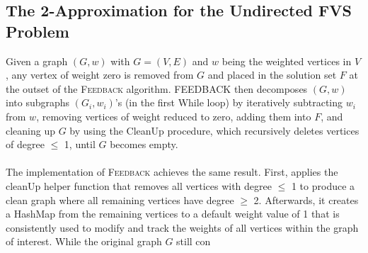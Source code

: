 
\subsection{The 2-Approximation for the Undirected FVS Problem}%
\label{sec:2approx}
Given a graph $(G, w)$ with $G = (V,E)$ and $w$ being the weighted vertices in $V$, any vertex of weight zero is removed from $G$ and placed in the solution set $F$ at the outset of the \textsc{Feedback} algorithm. \textsc{FEEDBACK} then decomposes $(G, w)$ into subgraphs $(G_i, w_i)$’s (in the first While loop) by iteratively subtracting $w_i$ from $w$, removing vertices of weight reduced to zero, adding them into $F$, and cleaning up $G$ by using the CleanUp procedure, which recursively deletes vertices of degree $\leq$ 1, until $G$ becomes empty.\\\\
The implementation of \textsc{Feedback} achieves the same result. First, applies the cleanUp helper function that removes all vertices with degree $\leq$ 1 to produce a clean graph where all remaining vertices have degree $\geq$ 2. Afterwards, it creates a HashMap from the remaining vertices to a default weight value of 1 that is consistently used to modify and track the weights of all vertices within the graph of interest. While the original graph $G$ still con %

